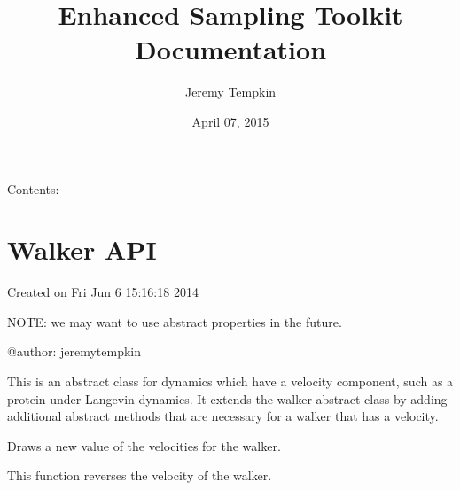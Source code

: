 \documentclass[letterpaper,10pt,english]{sphinxmanual}
\title{Enhanced Sampling Toolkit Documentation}
\date{April 07, 2015}
\author{Jeremy Tempkin}
\begin{document}
\maketitle
\tableofcontents
{}\label{index::doc}


Contents:


\chapter{Walker API}
\label{src/src.doc:welcome-to-enhanced-sampling-toolkit-s-documentation}\label{src/src.doc:module-walker}\label{src/src.doc::doc}\label{src/src.doc:walker-api}
Created on Fri Jun  6 15:16:18 2014

NOTE: we may want to use abstract properties in the future.

@author: jeremytempkin

\begin{fulllineitems}
\label{src/src.doc:walker.velocityWalker}
This is an abstract class for dynamics which have a velocity component, such as 
a protein under Langevin dynamics.  It extends the walker abstract class by
adding additional abstract methods that are necessary for a walker that has
a velocity.

\begin{fulllineitems}
\label{src/src.doc:walker.velocityWalker.drawVel}
Draws a new value of the velocities for the walker.

\end{fulllineitems}


\begin{fulllineitems}
\label{src/src.doc:walker.velocityWalker.reverseVel}
This function reverses the velocity of the walker.

\end{fulllineitems}


\end{fulllineitems}

\end{document}
